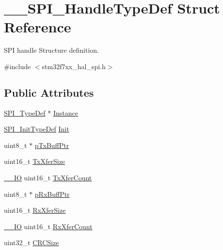 \hypertarget{struct_____s_p_i___handle_type_def}{}\section{\+\_\+\+\_\+\+S\+P\+I\+\_\+\+Handle\+Type\+Def Struct Reference}
\label{struct_____s_p_i___handle_type_def}


S\+PI handle Structure definition.  




{\ttfamily \#include $<$stm32f7xx\+\_\+hal\+\_\+spi.\+h$>$}

\subsection*{Public Attributes}
\begin{DoxyCompactItemize}
\item 
\mbox{\hyperlink{struct_s_p_i___type_def}{S\+P\+I\+\_\+\+Type\+Def}} $\ast$ \mbox{\hyperlink{struct_____s_p_i___handle_type_def_a97e276bfd322a6028cbac7408cf8e610}{Instance}}
\item 
\mbox{\hyperlink{struct_s_p_i___init_type_def}{S\+P\+I\+\_\+\+Init\+Type\+Def}} \mbox{\hyperlink{struct_____s_p_i___handle_type_def_a4b43d4d72f571b7d2162a2d171bb1312}{Init}}
\item 
uint8\+\_\+t $\ast$ \mbox{\hyperlink{struct_____s_p_i___handle_type_def_adb2e52ab20ae5ae6b89532155fec99af}{p\+Tx\+Buff\+Ptr}}
\item 
uint16\+\_\+t \mbox{\hyperlink{struct_____s_p_i___handle_type_def_a5617a3a7983aedb0d214f318062ebc48}{Tx\+Xfer\+Size}}
\item 
\mbox{\hyperlink{core__sc300_8h_aec43007d9998a0a0e01faede4133d6be}{\+\_\+\+\_\+\+IO}} uint16\+\_\+t \mbox{\hyperlink{struct_____s_p_i___handle_type_def_a186b770dda2e53c4e9a204cd50e17e74}{Tx\+Xfer\+Count}}
\item 
uint8\+\_\+t $\ast$ \mbox{\hyperlink{struct_____s_p_i___handle_type_def_aa770b67ee3966c0aa7409f64b3b99bd8}{p\+Rx\+Buff\+Ptr}}
\item 
uint16\+\_\+t \mbox{\hyperlink{struct_____s_p_i___handle_type_def_ab274a4c2de5e95145d45fe80a289f535}{Rx\+Xfer\+Size}}
\item 
\mbox{\hyperlink{core__sc300_8h_aec43007d9998a0a0e01faede4133d6be}{\+\_\+\+\_\+\+IO}} uint16\+\_\+t \mbox{\hyperlink{struct_____s_p_i___handle_type_def_a67e721440b3449d544a27cfd7726c920}{Rx\+Xfer\+Count}}
\item 
uint32\+\_\+t \mbox{\hyperlink{struct_____s_p_i___handle_type_def_abef898bf323d7e9d693665f12b6f6239}{C\+R\+C\+Size}}

\end{DoxyCompactItemize}
